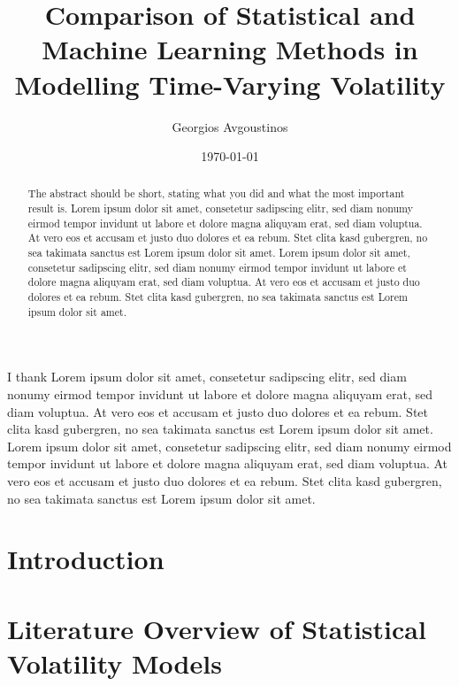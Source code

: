 \documentclass[a4paper, oneside]{discothesis}
\title{Comparison of Statistical and Machine Learning Methods in Modelling Time-Varying Volatility 
}
\author{Georgios Avgoustinos}
\institute{Department of Banking and Finance\\
University of Zurich}
\date{\today}
\begin{document}
\frontmatter %
\maketitle

\cleardoublepage

\begin{acknowledgements}
	I thank Lorem ipsum dolor sit amet, consetetur sadipscing elitr, sed diam nonumy eirmod tempor invidunt ut labore et dolore magna aliquyam erat, sed diam voluptua. At vero eos et accusam et justo duo dolores et ea rebum. Stet clita kasd gubergren, no sea takimata sanctus est Lorem ipsum dolor sit amet. Lorem ipsum dolor sit amet, consetetur sadipscing elitr, sed diam nonumy eirmod tempor invidunt ut labore et dolore magna aliquyam erat, sed diam voluptua. At vero eos et accusam et justo duo dolores et ea rebum. Stet clita kasd gubergren, no sea takimata sanctus est Lorem ipsum dolor sit amet.
\end{acknowledgements}


\begin{abstract}
    The abstract should be short, stating what you did and what the most important result is.
	Lorem ipsum dolor sit amet, consetetur sadipscing elitr, sed diam nonumy eirmod tempor invidunt ut labore et dolore magna aliquyam erat, sed diam voluptua. At vero eos et accusam et justo duo dolores et ea rebum. Stet clita kasd gubergren, no sea takimata sanctus est Lorem ipsum dolor sit amet. Lorem ipsum dolor sit amet, consetetur sadipscing elitr, sed diam nonumy eirmod tempor invidunt ut labore et dolore magna aliquyam erat, sed diam voluptua. At vero eos et accusam et justo duo dolores et ea rebum. Stet clita kasd gubergren, no sea takimata sanctus est Lorem ipsum dolor sit amet.
\end{abstract}

\tableofcontents

\mainmatter %

\chapter{Introduction}

\chapter{Literature Overview of Statistical Volatility Models}
\end{document}
